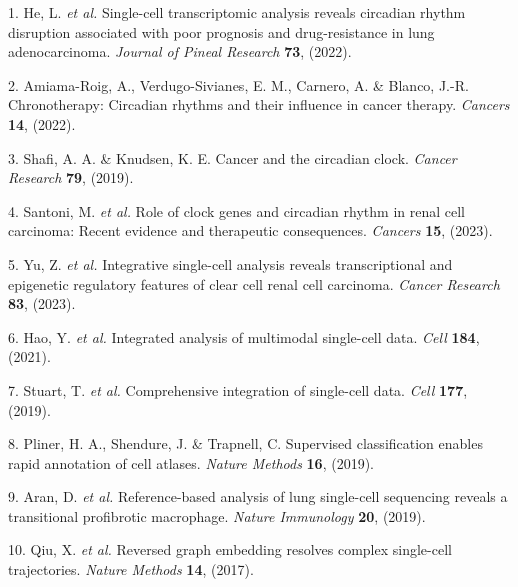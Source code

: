 \documentclass[
]{article}
\newenvironment{cslreferences}%
  {}%
  {\par}
\begin{document}
\hypertarget{refs}{}
\begin{cslreferences}
\leavevmode\hypertarget{ref-SingleCellTraHeLe2022}{}%
1. He, L. \emph{et al.} Single-cell transcriptomic analysis reveals circadian rhythm disruption associated with poor prognosis and drug-resistance in lung adenocarcinoma. \emph{Journal of Pineal Research} \textbf{73}, (2022).

\leavevmode\hypertarget{ref-ChronotherapyAmiama2022}{}%
2. Amiama-Roig, A., Verdugo-Sivianes, E. M., Carnero, A. \& Blanco, J.-R. Chronotherapy: Circadian rhythms and their influence in cancer therapy. \emph{Cancers} \textbf{14}, (2022).

\leavevmode\hypertarget{ref-CancerAndTheShafi2019}{}%
3. Shafi, A. A. \& Knudsen, K. E. Cancer and the circadian clock. \emph{Cancer Research} \textbf{79}, (2019).

\leavevmode\hypertarget{ref-RoleOfClockGSanton2023}{}%
4. Santoni, M. \emph{et al.} Role of clock genes and circadian rhythm in renal cell carcinoma: Recent evidence and therapeutic consequences. \emph{Cancers} \textbf{15}, (2023).

\leavevmode\hypertarget{ref-IntegrativeSinYuZh2023}{}%
5. Yu, Z. \emph{et al.} Integrative single-cell analysis reveals transcriptional and epigenetic regulatory features of clear cell renal cell carcinoma. \emph{Cancer Research} \textbf{83}, (2023).

\leavevmode\hypertarget{ref-IntegratedAnalHaoY2021}{}%
6. Hao, Y. \emph{et al.} Integrated analysis of multimodal single-cell data. \emph{Cell} \textbf{184}, (2021).

\leavevmode\hypertarget{ref-ComprehensiveIStuart2019}{}%
7. Stuart, T. \emph{et al.} Comprehensive integration of single-cell data. \emph{Cell} \textbf{177}, (2019).

\leavevmode\hypertarget{ref-SupervisedClasPliner2019}{}%
8. Pliner, H. A., Shendure, J. \& Trapnell, C. Supervised classification enables rapid annotation of cell atlases. \emph{Nature Methods} \textbf{16}, (2019).

\leavevmode\hypertarget{ref-ReferenceBasedAran2019}{}%
9. Aran, D. \emph{et al.} Reference-based analysis of lung single-cell sequencing reveals a transitional profibrotic macrophage. \emph{Nature Immunology} \textbf{20}, (2019).

\leavevmode\hypertarget{ref-ReversedGraphQiuX2017}{}%
10. Qiu, X. \emph{et al.} Reversed graph embedding resolves complex single-cell trajectories. \emph{Nature Methods} \textbf{14}, (2017).


\end{cslreferences}
\end{document}
